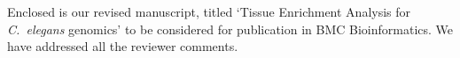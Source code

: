 \documentclass[12pt,stdletter,orderfromtodate,sigleft]{newlfm}
\begin{document}
\begin{newlfm}

 Enclosed is our revised manuscript, titled `Tissue Enrichment Analysis for \emph{C.~elegans} genomics' to be considered for publication in BMC Bioinformatics. We have addressed all the reviewer comments. 


\end{newlfm}
\end{document}
